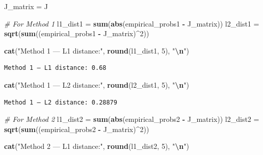 \documentclass[
]{article}
\newenvironment{Shaded}{\begin{snugshade}}{\end{snugshade}}
\newcommand{\CommentTok}[1]{\textcolor[rgb]{0.56,0.35,0.01}{\textit{#1}}}
\newcommand{\DecValTok}[1]{\textcolor[rgb]{0.00,0.00,0.81}{#1}}
\newcommand{\FunctionTok}[1]{\textcolor[rgb]{0.13,0.29,0.53}{\textbf{#1}}}
\newcommand{\NormalTok}[1]{#1}
\newcommand{\OtherTok}[1]{\textcolor[rgb]{0.56,0.35,0.01}{#1}}
\newcommand{\SpecialCharTok}[1]{\textcolor[rgb]{0.81,0.36,0.00}{\textbf{#1}}}
\newcommand{\StringTok}[1]{\textcolor[rgb]{0.31,0.60,0.02}{#1}}
\begin{document}
\begin{Shaded}
\begin{Highlighting}[]
\NormalTok{J\_matrix }\OtherTok{=}\NormalTok{ J}

\CommentTok{\# For Method 1}
\NormalTok{l1\_dist1 }\OtherTok{=} \FunctionTok{sum}\NormalTok{(}\FunctionTok{abs}\NormalTok{(empirical\_probs1 }\SpecialCharTok{{-}}\NormalTok{ J\_matrix))}
\NormalTok{l2\_dist1 }\OtherTok{=} \FunctionTok{sqrt}\NormalTok{(}\FunctionTok{sum}\NormalTok{((empirical\_probs1 }\SpecialCharTok{{-}}\NormalTok{ J\_matrix)}\SpecialCharTok{\^{}}\DecValTok{2}\NormalTok{))}

\FunctionTok{cat}\NormalTok{(}\StringTok{"Method 1 — L1 distance:"}\NormalTok{, }\FunctionTok{round}\NormalTok{(l1\_dist1, }\DecValTok{5}\NormalTok{), }\StringTok{"}\SpecialCharTok{\textbackslash{}n}\StringTok{"}\NormalTok{)}
\end{Highlighting}
\end{Shaded}

\begin{verbatim}
Method 1 — L1 distance: 0.68 
\end{verbatim}

\begin{Shaded}
\begin{Highlighting}[]
\FunctionTok{cat}\NormalTok{(}\StringTok{"Method 1 — L2 distance:"}\NormalTok{, }\FunctionTok{round}\NormalTok{(l2\_dist1, }\DecValTok{5}\NormalTok{), }\StringTok{"}\SpecialCharTok{\textbackslash{}n}\StringTok{"}\NormalTok{)}
\end{Highlighting}
\end{Shaded}

\begin{verbatim}
Method 1 — L2 distance: 0.28879 
\end{verbatim}

\begin{Shaded}
\begin{Highlighting}[]
\CommentTok{\# For Method 2}
\NormalTok{l1\_dist2 }\OtherTok{=} \FunctionTok{sum}\NormalTok{(}\FunctionTok{abs}\NormalTok{(empirical\_probs2 }\SpecialCharTok{{-}}\NormalTok{ J\_matrix))}
\NormalTok{l2\_dist2 }\OtherTok{=} \FunctionTok{sqrt}\NormalTok{(}\FunctionTok{sum}\NormalTok{((empirical\_probs2 }\SpecialCharTok{{-}}\NormalTok{ J\_matrix)}\SpecialCharTok{\^{}}\DecValTok{2}\NormalTok{))}

\FunctionTok{cat}\NormalTok{(}\StringTok{"Method 2 — L1 distance:"}\NormalTok{, }\FunctionTok{round}\NormalTok{(l1\_dist2, }\DecValTok{5}\NormalTok{), }\StringTok{"}\SpecialCharTok{\textbackslash{}n}\StringTok{"}\NormalTok{)}
\end{Highlighting}
\end{Shaded}
\end{document}
